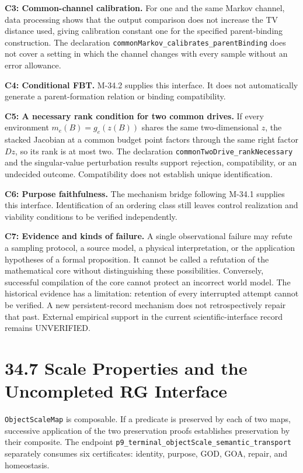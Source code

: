 \documentclass[
  english,
  11pt,
  oneside]{book}
\begin{document}
\textbf{C3: Common-channel calibration.} For one and the same Markov channel, data processing shows that the output comparison does not increase the TV distance used, giving calibration constant one for the specified parent-binding construction. The declaration \nolinkurl{commonMarkov_calibrates_parentBinding} does not cover a setting in which the channel changes with every sample without an error allowance.

\textbf{C4: Conditional FBT.} M-34.2 supplies this interface. It does not automatically generate a parent-formation relation or binding compatibility.

\textbf{C5: A necessary rank condition for two common drives.} If every environment \(m_e(B)=g_e(z(B))\) shares the same two-dimensional \(z\), the stacked Jacobian at a common budget point factors through the same right factor \(Dz\), so its rank is at most two. The declaration \nolinkurl{commonTwoDrive_rankNecessary} and the singular-value perturbation results support rejection, compatibility, or an undecided outcome. Compatibility does not establish unique identification.

\textbf{C6: Purpose faithfulness.} The mechanism bridge following M-34.1 supplies this interface. Identification of an ordering class still leaves control realization and viability conditions to be verified independently.

\textbf{C7: Evidence and kinds of failure.} A single observational failure may refute a sampling protocol, a source model, a physical interpretation, or the application hypotheses of a formal proposition. It cannot be called a refutation of the mathematical core without distinguishing these possibilities. Conversely, successful compilation of the core cannot protect an incorrect world model. The historical evidence has a limitation: retention of every interrupted attempt cannot be verified. A new persistent-record mechanism does not retrospectively repair that past. External empirical support in the current scientific-interface record remains UNVERIFIED.

\section{34.7 Scale Properties and the Uncompleted RG Interface}\label{scale-properties-and-the-uncompleted-rg-interface}

\nolinkurl{ObjectScaleMap} is composable. If a predicate is preserved by each of two maps, successive application of the two preservation proofs establishes preservation by their composite. The endpoint \nolinkurl{p9_terminal_objectScale_semantic_transport} separately consumes six certificates: identity, purpose, GOD, GOA, repair, and homeostasis.
\end{document}
